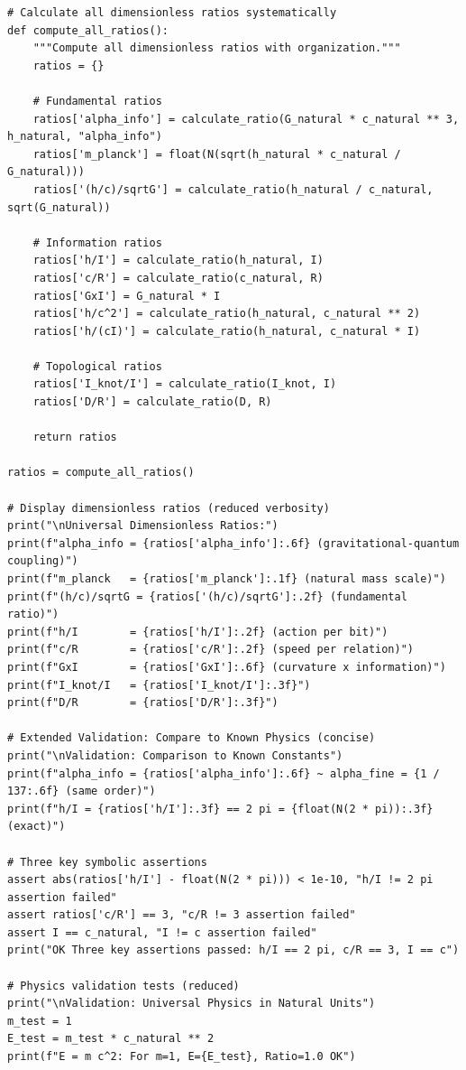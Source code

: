 \documentclass{article}
\begin{document}
\begin{verbatim}
# Calculate all dimensionless ratios systematically
def compute_all_ratios():
    """Compute all dimensionless ratios with organization."""
    ratios = {}
    
    # Fundamental ratios
    ratios['alpha_info'] = calculate_ratio(G_natural * c_natural ** 3, h_natural, "alpha_info")
    ratios['m_planck'] = float(N(sqrt(h_natural * c_natural / G_natural)))
    ratios['(h/c)/sqrtG'] = calculate_ratio(h_natural / c_natural, sqrt(G_natural))
    
    # Information ratios
    ratios['h/I'] = calculate_ratio(h_natural, I)
    ratios['c/R'] = calculate_ratio(c_natural, R)
    ratios['GxI'] = G_natural * I
    ratios['h/c^2'] = calculate_ratio(h_natural, c_natural ** 2)
    ratios['h/(cI)'] = calculate_ratio(h_natural, c_natural * I)
    
    # Topological ratios
    ratios['I_knot/I'] = calculate_ratio(I_knot, I)
    ratios['D/R'] = calculate_ratio(D, R)
    
    return ratios

ratios = compute_all_ratios()

# Display dimensionless ratios (reduced verbosity)
print("\nUniversal Dimensionless Ratios:")
print(f"alpha_info = {ratios['alpha_info']:.6f} (gravitational-quantum coupling)")
print(f"m_planck   = {ratios['m_planck']:.1f} (natural mass scale)")
print(f"(h/c)/sqrtG = {ratios['(h/c)/sqrtG']:.2f} (fundamental ratio)")
print(f"h/I        = {ratios['h/I']:.2f} (action per bit)")
print(f"c/R        = {ratios['c/R']:.2f} (speed per relation)")
print(f"GxI        = {ratios['GxI']:.6f} (curvature x information)")
print(f"I_knot/I   = {ratios['I_knot/I']:.3f}")
print(f"D/R        = {ratios['D/R']:.3f}")

# Extended Validation: Compare to Known Physics (concise)
print("\nValidation: Comparison to Known Constants")
print(f"alpha_info = {ratios['alpha_info']:.6f} ~ alpha_fine = {1 / 137:.6f} (same order)")
print(f"h/I = {ratios['h/I']:.3f} == 2 pi = {float(N(2 * pi)):.3f} (exact)")

# Three key symbolic assertions
assert abs(ratios['h/I'] - float(N(2 * pi))) < 1e-10, "h/I != 2 pi assertion failed"
assert ratios['c/R'] == 3, "c/R != 3 assertion failed"
assert I == c_natural, "I != c assertion failed"
print("OK Three key assertions passed: h/I == 2 pi, c/R == 3, I == c")

# Physics validation tests (reduced)
print("\nValidation: Universal Physics in Natural Units")
m_test = 1
E_test = m_test * c_natural ** 2
print(f"E = m c^2: For m=1, E={E_test}, Ratio=1.0 OK")


\end{verbatim}
\end{document}
